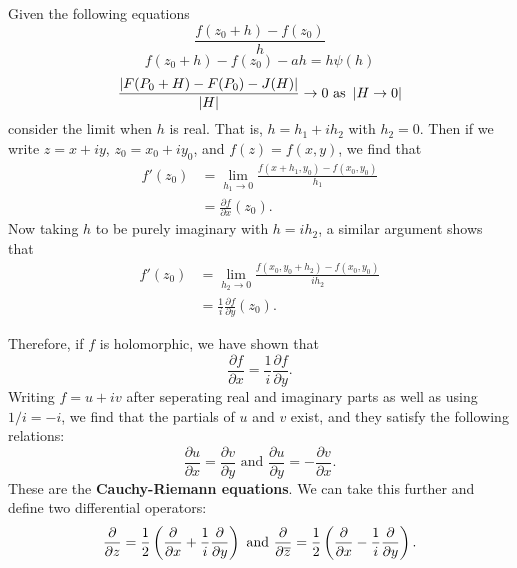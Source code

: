 \documentclass{exam}
\begin{document}
Given the following equations
\begin{equation}
    \frac{f(z_0 + h) - f(z_0)}{h}
\end{equation}
\begin{equation}
    f(z_0 + h) - f(z_0) - ah = h\psi(h)
\end{equation}
\begin{equation}
    \frac{\left| F(P_0 + H) - F(P_0) - J(H) \right|}{\left| H \right|} \to 0 \text{ as } \left| H\to 0 \right|
\end{equation}
consider the limit when $h$ is real. That is, $h = h_1 + ih_2$ with $h_2 = 0$. Then if we write $z = x + iy$, $z_0 = x_0 + iy_0$, and $f(z) = f(x, y)$,
we find that
\begin{align*}
    f'(z_0) &= \lim_{h_1\to 0} \frac{f(x + h_1, y_0) - f(x_0, y_0)}{h_1} \\
    &= \frac{\partial f}{\partial x}(z_0).
\end{align*}
Now taking $h$ to be purely imaginary with $h = ih_2$, a similar argument shows that
\begin{align*}
    f'(z_0) &= \lim_{h_2\to 0}\frac{f(x_0, y_0 + h_2) - f(x_0, y_0)}{ih_2} \\
    &= \frac{1}{i} \frac{\partial f}{\partial y}(z_0).
\end{align*}

Therefore, if $f$ is holomorphic, we have shown that 
$$\frac{\partial f}{\partial x} = \frac{1}{i}\frac{\partial f}{\partial y}.$$
Writing $f = u + iv$ after seperating real and imaginary parts as well as using $1 / i = -i$, we find that the partials of $u$ and $v$ exist,
and they satisfy the following relations:
$$\frac{\partial u}{\partial x} = \frac{\partial v}{\partial y} \text{ and } \frac{\partial u}{\partial y} = -\frac{\partial v}{\partial x}.$$
These are the \textbf{Cauchy-Riemann equations}. We can take this further and define two differential operators:
$$\frac{\partial}{\partial z} = \frac{1}{2}\left( \frac{\partial}{\partial x} + \frac{1}{i}\frac{\partial}{\partial y} \right) 
\text{ and } 
\frac{\partial}{\partial \overline{z}} = \frac{1}{2}\left( \frac{\partial}{\partial x} - \frac{1}{i}\frac{\partial}{\partial y} \right).$$
\end{document}
